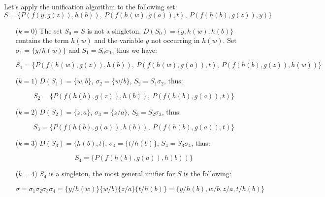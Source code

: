 \begin{example}
Let's apply the unification algorithm to the following set: 
$$
S=\{P(f(y,g(z)),h(b)),\ P(f(h(w),g(a)),t),\ P(f(h(b),g(z)),y)\}
$$
\begin{itemize}
    \item[($k=0$)] The set $S_0=S$ is not a singleton, $D(S_0)=\{y,h(w),h(b)\}$ contains the term $h(w)$ and the variable $y$ not occurring in $h(w)$. Set $\sigma_1=\{y/h(w)\}$ and $S_1=S_0\sigma_1$, thus we have:
    
    $$S_1=\{P(f(h(w),g(z)),h(b)),\ P(f(h(w),g(a)),t),\ P(f(h(b),g(z)),h(w))\}$$

    \item[($k=1$)] $D(S_1)=\{w,b\}$, $\sigma_2=\{w/b\}$, $S_2=S_1\sigma_2$, thus:
    
    $$S_2=\{P(f(h(b),g(z)),h(b)),\ P(f(h(b),g(a)),t)\}$$
        
    \item[($k=2$)] $D(S_2)=\{z,a\}$, $\sigma_3=\{z/a\}$, $S_3=S_2\sigma_3$, thus:
    
    $$S_3=\{P(f(h(b),g(a)),h(b)),\ P(f(h(b),g(a)),t)\}$$

    \item[($k=3$)] $D(S_3)=\{h(b),t\}$, $\sigma_4=\{t/h(b)\}$, $S_4=S_3\sigma_4$, thus:
    
    $$S_4=\{P(f(h(b),g(a)),h(b))\}$$

    \item[($k=4$)] $S_4$ is a singleton, the most general unifier for $S$ is the following:
    
    $$
    \sigma=\sigma_1\sigma_2\sigma_3\sigma_4=\{y/h(w)\}\{w/b\}\{z/a\}\{t/h(b)\}=\{y/h(b),w/b,z/a,t/h(b)\}
    $$
\end{itemize}     
\end{example}

